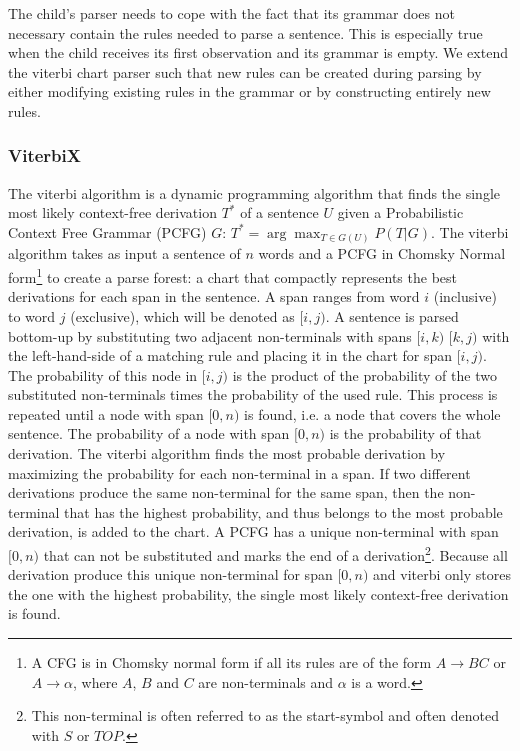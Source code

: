 \documentclass[a4paper]{article}
\begin{document}
The child's parser needs to cope with the fact that its grammar does not necessary contain the rules needed to parse a sentence. This is especially true when the child receives its first observation and its grammar is empty. We extend the viterbi chart parser such that new rules can be created during parsing by either modifying existing rules in the grammar or by constructing entirely new rules. 

\subsubsection{ViterbiX} %
The viterbi algorithm is a dynamic programming algorithm that finds the single most likely context-free derivation $T^*$ of a sentence $U$ given a Probabilistic Context Free Grammar (PCFG) $G$: $T^* = \arg \max_{T \in G(U)} P(T|G)$. The viterbi algorithm takes as input a sentence of $n$ words and a PCFG in Chomsky Normal form\footnote{A CFG is in Chomsky normal form if all its rules are of the form $A \rightarrow BC$ or $A \rightarrow \alpha$, where $A$, $B$ and $C$ are non-terminals and $\alpha$ is a word.} to create a parse forest: a chart that compactly represents the best derivations for each span in the sentence. A span ranges from word $i$ (inclusive) to word $j$ (exclusive), which will be denoted as $[i,j)$. A sentence is parsed bottom-up by substituting two adjacent non-terminals with spans $[i,k)$ $[k,j)$ with the left-hand-side of a matching rule and placing it in the chart for span $[i,j)$. The probability of this node in $[i,j)$ is the product of the probability of the two substituted non-terminals times the probability of the used rule. This process is repeated until a node with span $[0,n)$ is found, i.e. a node that covers the whole sentence. The probability of a node with span $[0,n)$ is the probability of that derivation. The viterbi algorithm finds the most probable derivation by maximizing the probability for each non-terminal in a span. If two different derivations produce the same non-terminal for the same span, then the non-terminal that has the highest probability, and thus belongs to the most probable derivation, is added to the chart. A PCFG has a unique non-terminal with span $[0,n)$ that can not be substituted and marks the end of a derivation\footnote{This non-terminal is often referred to as the start-symbol and often denoted with $S$ or $TOP$.}. Because all derivation produce this unique non-terminal for span $[0,n)$ and viterbi only stores the one with the highest probability, the single most likely context-free derivation is found. 
\end{document}
